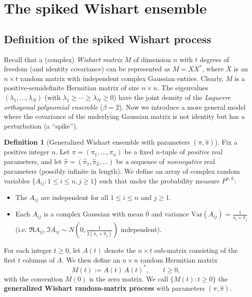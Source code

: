 \documentclass[letterpaper,11pt,oneside,reqno]{book}
\numberwithin{equation}{chapter}  %
\theoremstyle{definition}
\newtheorem{definition}[proposition]{Definition}
\begin{document}
\section{The spiked Wishart ensemble}
\label{lecture13:sec:Wishart}

\subsection{Definition of the spiked Wishart process}
\label{lecture13:sub:Wishart_process}

Recall that a (complex) \emph{Wishart matrix} $M$ of dimension
$n$ with $t$ degrees of freedom (and identity covariance)
can be represented as $M = X X^*$, where $X$ is an $n\times
t$ random matrix with independent complex Gaussian entries.
Clearly, $M$ is a positive-semidefinite Hermitian matrix of
size $n\times n$. The eigenvalues
$(\lambda_1,\dots,\lambda_N)$ (with $\lambda_1\ge \cdots \ge
\lambda_N \ge 0$) have the joint density of the
\emph{Laguerre orthogonal polynomial ensemble} ($\beta=2$).
Now we introduce a more
general model where the covariance of the underlying
Gaussian matrix is not identity but has a
perturbation (a ``spike'').

\begin{definition}[Generalized Wishart ensemble with parameters $(\pi,\hat\pi)$]\label{lecture13:def:Wishart}
Fix a positive integer $n$. Let $\pi=(\pi_1,\dots,\pi_n)$ be a fixed $n$-tuple of \emph{positive} real parameters, and let $\hat\pi = (\hat\pi_1,\hat\pi_2,\dots)$ be a sequence of \emph{nonnegative} real parameters (possibly infinite in length). We define an array of complex random variables $\{A_{ij}: 1\le i\le n, j\ge 1\}$ such that under the probability measure $P^{\pi,\hat\pi}$:
\begin{itemize}\item The $A_{ij}$ are independent for all $1\le i\le n$ and $j\ge 1$.
\item Each $A_{ij}$ is a complex Gaussian with mean $0$ and variance $\mathrm{Var}(A_{ij}) = \frac{1}{\pi_i + \hat\pi_j}$ (i.e. $\Re A_{ij}, \Im A_{ij} \sim N(0,\frac{1}{2(\pi_i+\hat\pi_j)})$ independent).
\end{itemize}
For each integer $t\ge 0$, let $A(t)$ denote the $n\times t$ sub-matrix consisting of the first $t$ columns of $A$. We then define an $n\times n$ random Hermitian matrix
\[ M(t) := A(t)\,A(t)^*, \qquad t\ge 0, \]
with the convention $M(0)$ is the zero matrix. We call $\{M(t): t\ge 0\}$ the \textbf{generalized Wishart random-matrix process} with parameters $(\pi,\hat\pi)$.
\end{definition}
\end{document}

